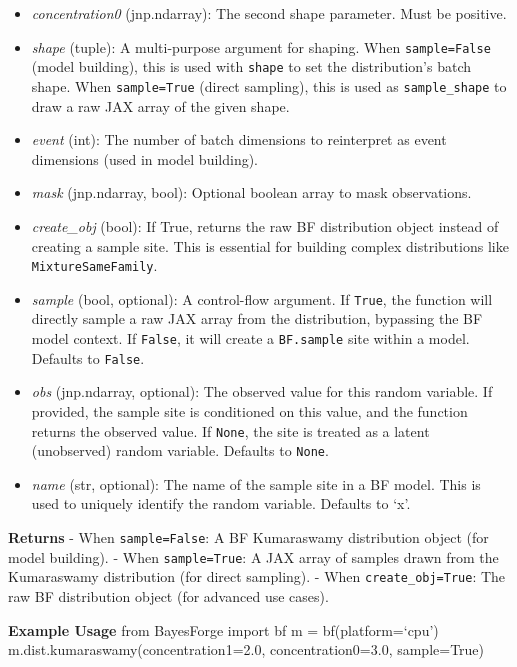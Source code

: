 \documentclass[
  letterpaper,
  DIV=11,
  numbers=noendperiod]{scrartcl}
\begin{document}
\begin{itemize}
\item
  \emph{concentration0} (jnp.ndarray): The second shape parameter. Must
  be positive.
\item
  \emph{shape} (tuple): A multi-purpose argument for shaping. When
  \texttt{sample=False} (model building), this is used with
  \texttt{shape} to set the distribution's batch shape. When
  \texttt{sample=True} (direct sampling), this is used as
  \texttt{sample\_shape} to draw a raw JAX array of the given shape.
\item
  \emph{event} (int): The number of batch dimensions to reinterpret as
  event dimensions (used in model building).
\item
  \emph{mask} (jnp.ndarray, bool): Optional boolean array to mask
  observations.
\item
  \emph{create\_obj} (bool): If True, returns the raw BF distribution
  object instead of creating a sample site. This is essential for
  building complex distributions like \texttt{MixtureSameFamily}.
\item
  \emph{sample} (bool, optional): A control-flow argument. If
  \texttt{True}, the function will directly sample a raw JAX array from
  the distribution, bypassing the BF model context. If \texttt{False},
  it will create a \texttt{BF.sample} site within a model. Defaults to
  \texttt{False}.
\item
  \emph{obs} (jnp.ndarray, optional): The observed value for this random
  variable. If provided, the sample site is conditioned on this value,
  and the function returns the observed value. If \texttt{None}, the
  site is treated as a latent (unobserved) random variable. Defaults to
  \texttt{None}.
\item
  \emph{name} (str, optional): The name of the sample site in a BF
  model. This is used to uniquely identify the random variable. Defaults
  to `x'.
\end{itemize}

\textbf{Returns} - When \texttt{sample=False}: A BF Kumaraswamy
distribution object (for model building). - When \texttt{sample=True}: A
JAX array of samples drawn from the Kumaraswamy distribution (for direct
sampling). - When \texttt{create\_obj=True}: The raw BF distribution
object (for advanced use cases).

\textbf{Example Usage} from BayesForge import bf m = bf(platform=`cpu')
m.dist.kumaraswamy(concentration1=2.0, concentration0=3.0, sample=True)
\end{document}
